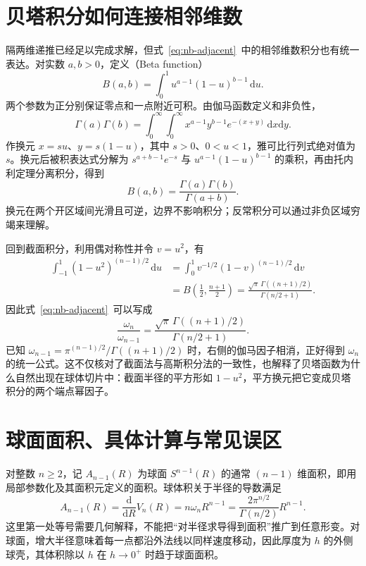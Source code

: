 \documentclass[UTF8]{ctexart}
\begin{document}
\section{贝塔积分如何连接相邻维数}
\label{sec:nb-beta}

隔两维递推已经足以完成求解，但式~\eqref{eq:nb-adjacent}~中的相邻维数积分也有统一表达。对实数 $a,b>0$，定义（Beta function）
\[
  B(a,b)=\int_0^1u^{a-1}(1-u)^{b-1}\,\mathrm du.
\]
两个参数为正分别保证零点和一点附近可积。由伽马函数定义和非负性，
\[
  \Gamma(a)\Gamma(b)=\int_0^\infty\int_0^\infty
  x^{a-1}y^{b-1}e^{-(x+y)}\,\mathrm dx\mathrm dy.
\]
作换元 $x=su$、$y=s(1-u)$，其中 $s>0$、$0<u<1$，雅可比行列式绝对值为 $s$。换元后被积表达式分解为 $s^{a+b-1}e^{-s}$ 与 $u^{a-1}(1-u)^{b-1}$ 的乘积，再由托内利定理分离积分，得到
\begin{equation}\label{eq:nb-beta-gamma}
  B(a,b)=\frac{\Gamma(a)\Gamma(b)}{\Gamma(a+b)}.
\end{equation}
换元在两个开区域间光滑且可逆，边界不影响积分；反常积分可以通过非负区域穷竭来理解。

回到截面积分，利用偶对称性并令 $v=u^2$，有
\begin{align*}
  \int_{-1}^1(1-u^2)^{(n-1)/2}\,\mathrm du
  &=\int_0^1v^{-1/2}(1-v)^{(n-1)/2}\,\mathrm dv\\
  &=B\!\left(\frac12,\frac{n+1}{2}\right)
   =\frac{\sqrt\pi\,\Gamma((n+1)/2)}{\Gamma(n/2+1)}.
\end{align*}
因此式~\eqref{eq:nb-adjacent}~可以写成
\[
  \frac{\omega_n}{\omega_{n-1}}
  =\frac{\sqrt\pi\,\Gamma((n+1)/2)}{\Gamma(n/2+1)}.
\]
已知 $\omega_{n-1}=\pi^{(n-1)/2}/\Gamma((n+1)/2)$ 时，右侧的伽马因子相消，正好得到 $\omega_n$ 的统一公式。这不仅核对了截面法与高斯积分法的一致性，也解释了贝塔函数为什么自然出现在球体切片中：截面半径的平方形如 $1-u^2$，平方换元把它变成贝塔积分的两个端点幂因子。

\section{球面面积、具体计算与常见误区}
\label{sec:nb-surface}

对整数 $n\geq2$，记 $A_{n-1}(R)$ 为球面 $S^{n-1}(R)$ 的通常 $(n-1)$ 维面积，即用局部参数化及其面积元定义的面积。球体积关于半径的导数满足
\begin{equation}\label{eq:nb-area}
  A_{n-1}(R)=\frac{\mathrm d}{\mathrm dR}V_n(R)
  =n\omega_nR^{n-1}
  =\frac{2\pi^{n/2}}{\Gamma(n/2)}R^{n-1}.
\end{equation}
这里第一处等号需要几何解释，不能把“对半径求导得到面积”推广到任意形变。对球面，增大半径意味着每一点都沿外法线以同样速度移动，因此厚度为 $h$ 的外侧球壳，其体积除以 $h$ 在 $h\to0^+$ 时趋于球面面积。
\end{document}
